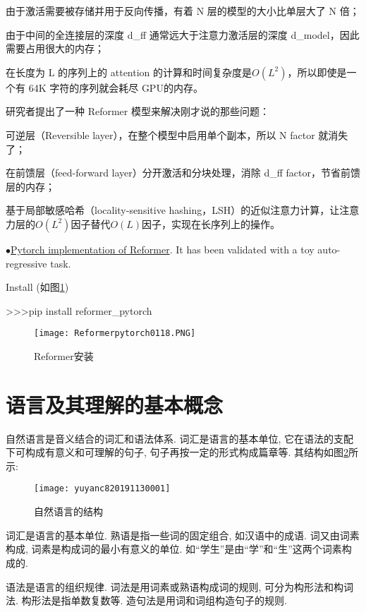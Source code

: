 由于激活需要被存储并用于反向传播，有着 N 层的模型的大小比单层大了 N 倍；

由于中间的全连接层的深度 d\_ff 通常远大于注意力激活层的深度 d\_model，因此需要占用很大的内存；

在长度为 L 的序列上的 attention 的计算和时间复杂度是$O(L^2)$，所以即使是一个有 64K 字符的序列就会耗尽 GPU的内存。

研究者提出了一种 Reformer 模型来解决刚才说的那些问题：

可逆层（Reversible layer），在整个模型中启用单个副本，所以 N factor 就消失了；

在前馈层（feed-forward layer）分开激活和分块处理，消除 d\_ff factor，节省前馈层的内存；

基于局部敏感哈希（locality-sensitive hashing，LSH）的近似注意力计算，让注意力层的$ O(L^2)$因子替代$ O(L)$因子，实现在长序列上的操作。

$\bullet$\href{https://openreview.net/pdf?id=rkgNKkHtvB}{Pytorch implementation of Reformer}. It has been validated with a toy auto-regressive task.

Install (如图\ref{PycharmPytorchReformer})

>>>pip install reformer\_pytorch
\begin{figure}[htbp]
\centering
\texttt{[image: Reformerpytorch0118.PNG]}
\caption{Reformer安装}
\label{PycharmPytorchReformer}
\end{figure}
\section{语言及其理解的基本概念}
自然语言是音义结合的词汇和语法体系. 词汇是语言的基本单位, 它在语法的支配下可构成有意义和可理解的句子, 句子再按一定的形式构成篇章等. 其结构如图\ref{AI32fig3001}所示:
\begin{figure}[H]
\centering
\texttt{[image: yuyanc820191130001]}
\caption{自然语言的结构}
\label{AI32fig3001}
\end{figure}

词汇是语言的基本单位. 熟语是指一些词的固定组合, 如汉语中的成语. 词又由词素构成, 词素是构成词的最小有意义的单位. 如“学生”是由“学”和“生”这两个词素构成的.

语法是语言的组织规律. 词法是用词素或熟语构成词的规则, 可分为构形法和构词法. 构形法是指单数复数等. 造句法是用词和词组构造句子的规则.
